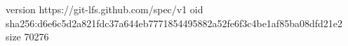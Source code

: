 version https://git-lfs.github.com/spec/v1
oid sha256:d6e6c5d2a821fdc37a644eb7771854495882a52fe6f3c4be1af85ba08dfd21e2
size 70276
